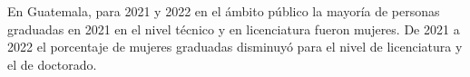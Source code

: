En Guatemala, para 2021 y 2022 en el ámbito público la mayoría de personas graduadas en 2021 en el nivel técnico y en licenciatura fueron mujeres. De 2021 a 2022 el porcentaje de mujeres graduadas disminuyó para el nivel de licenciatura y el de doctorado. 